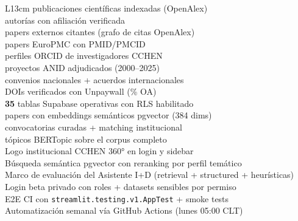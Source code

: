 \documentclass[12pt,a4paper]{report}
\begin{document}
\begin{infobox}
\begin{tabular}{L{13cm}}
  \faCheckCircle\quad \textbf{\StatPublications} publicaciones científicas indexadas (OpenAlex) \\
  \faCheckCircle\quad \textbf{\StatAuthorias} autorías con afiliación verificada \\
  \faCheckCircle\quad \textbf{\StatCiting} papers externos citantes (grafo de citas OpenAlex) \\
  \faCheckCircle\quad \textbf{\StatEuropmc} papers EuroPMC con PMID/PMCID \\
  \faCheckCircle\quad \textbf{\StatOrcid} perfiles ORCID de investigadores CCHEN \\
  \faCheckCircle\quad \textbf{\StatAnid} proyectos ANID adjudicados (2000--2025) \\
  \faCheckCircle\quad \textbf{\StatConvenios} convenios nacionales + \textbf{\StatAcuerdos} acuerdos internacionales \\
  \faCheckCircle\quad \textbf{\StatUnpaywall} DOIs verificados con Unpaywall (\StatOApct\% OA) \\
  \faCheckCircle\quad \textbf{35} tablas Supabase operativas con RLS habilitado \\
  \faCheckCircle\quad \textbf{\StatEmbeddings} papers con embeddings semánticos pgvector (384 dims) \\
  \faCheckCircle\quad \textbf{\StatConvocatorias} convocatorias curadas + matching institucional \\
  \faCheckCircle\quad \textbf{\StatBertopic} tópicos BERTopic sobre el corpus completo \\
  \faCheckCircle\quad Logo institucional CCHEN 360° en login y sidebar \\
  \faCheckCircle\quad Búsqueda semántica pgvector con reranking por perfil temático \\
  \faCheckCircle\quad Marco de evaluación del Asistente I+D (retrieval + structured + heurísticas) \\
  \faCheckCircle\quad Login beta privado con roles + datasets sensibles por permiso \\
  \faCheckCircle\quad E2E CI con \texttt{streamlit.testing.v1.AppTest} + smoke tests \\
  \faCheckCircle\quad Automatización semanal vía GitHub Actions (lunes 05:00 CLT) \\
\end{tabular}
\end{infobox}
\end{document}
